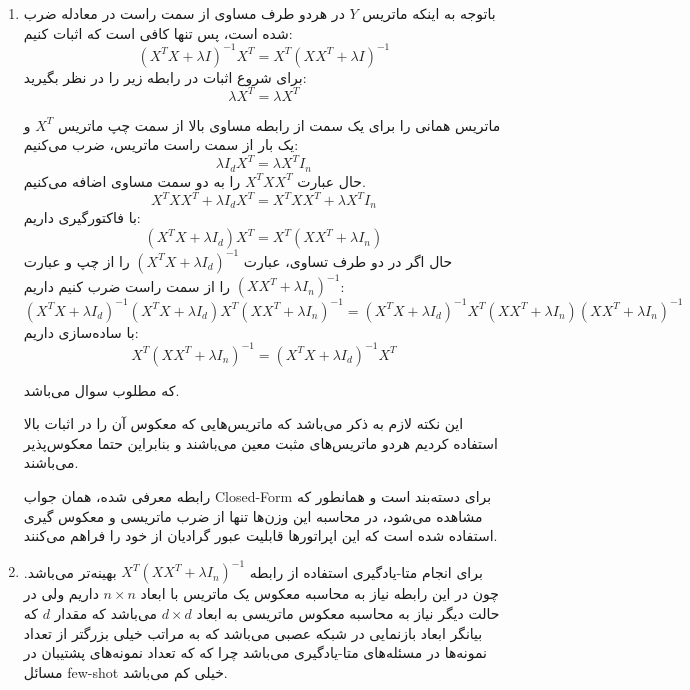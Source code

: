 \documentclass{article}
\begin{document}
\begin{enumerate}
	\item
	باتوجه به اینکه ماتریس $Y$ در هردو طرف مساوی از سمت راست در معادله ضرب شده است،‌ پس تنها کافی است که اثبات کنیم:
	$$
	{\left( {{X^T}X + \lambda I} \right)^{ - 1}}{X^T} = {X^T}{\left( {X{X^T} + \lambda I} \right)^{ - 1}}
	$$
	برای شروع اثبات در رابطه زیر را در نظر بگیرید:
	$$
	\lambda {X^T} = \lambda {X^T}
	$$
	
	ماتریس همانی را برای یک سمت از رابطه مساوی بالا از سمت چپ ماتریس 
	${X^T}$
	و یک بار از سمت راست ماتریس،‌ ضرب می‌کنیم:
	$$
	\lambda {I_d}{X^T} = \lambda {X^T}{I_n}
	$$
	حال عبارت
	${X^T}X{X^T}$
	را به دو سمت مساوی اضافه می‌کنیم.
	$$
	{X^T}X{X^T} + \lambda {I_d}{X^T} = {X^T}X{X^T} + \lambda {X^T}{I_n}
	$$
	با فاکتورگیری داریم:
	$$
	\left( {{X^T}X + \lambda {I_d}} \right){X^T} = {X^T}\left( {X{X^T} + \lambda {I_n}} \right)
	$$
	حال اگر در دو طرف تساوی، عبارت
	${\left( {{X^T}X + \lambda {I_d}} \right)^{ - 1}}$
	را از چپ و عبارت
	${\left( {X{X^T} + \lambda {I_n}} \right)^{ - 1}}$
	را از سمت راست ضرب کنیم داریم:
	$$
	{\left( {{X^T}X + \lambda {I_d}} \right)^{ - 1}}\left( {{X^T}X + \lambda {I_d}} \right){X^T}{\left( {X{X^T} + \lambda {I_n}} \right)^{ - 1}} = {\left( {{X^T}X + \lambda {I_d}} \right)^{ - 1}}{X^T}\left( {X{X^T} + \lambda {I_n}} \right){\left( {X{X^T} + \lambda {I_n}} \right)^{ - 1}}
	$$
	با ساده‌سازی داریم:
	$$
	{X^T}{\left( {X{X^T} + \lambda {I_n}} \right)^{ - 1}} = {\left( {{X^T}X + \lambda {I_d}} \right)^{ - 1}}{X^T}
	$$
	
	که مطلوب سوال می‌باشد. 
	
		این نکته لازم به ذکر می‌باشد که ماتریس‌هایی که معکوس آن را در اثبات بالا استفاده کردیم هردو ماتریس‌های مثبت ‌معین می‌باشند و بنابراین حتما معکوس‌پذیر می‌باشند.
	
	رابطه معرفی شده، همان جواب Closed-Form برای دسته‌بند 
	است و همانطور که مشاهده می‌شود، در محاسبه این وزن‌ها تنها از ضرب ماتریسی و معکوس گیری استفاده شده است که این‌ اپراتورها قابلیت عبور گرادیان از خود را فراهم می‌کنند.
	
\item
	
	برای انجام متا-یادگیری استفاده از رابطه
	${X^T}{\left( {X{X^T} + \lambda {I_n}} \right)^{ - 1}}$
	بهینه‌تر می‌باشد. چون در این رابطه نیاز به محاسبه معکوس یک ماتریس با ابعاد
	$n \times n$
	داریم ولی در حالت دیگر نیاز به محاسبه معکوس ماتریسی به ابعاد
	$d \times d$
	می‌باشد که مقدار $d$ که بیانگر ابعاد بازنمایی در شبکه عصبی می‌باشد که به مراتب خیلی بزرگتر از تعداد نمونه‌ها در مسئله‌های متا-یادگیری می‌باشد چرا که که تعداد نمونه‌های پشتیبان در مسائل few-shot خیلی کم می‌باشد.
	

\end{enumerate}
\end{document}
